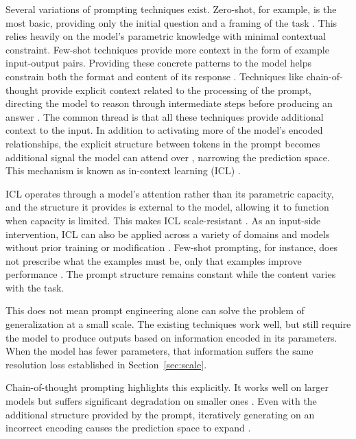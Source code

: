 \documentclass[master]{thesis}
\newcommand{\sref}[1]{Section~\ref{#1}}  %
\begin{document}
Several variations of prompting techniques exist. Zero-shot, for example, is the most basic, providing only the initial question and a framing of the task \cite{brown2020gpt3}. This relies heavily on the model's parametric knowledge with minimal contextual constraint. Few-shot techniques provide more context in the form of example input-output pairs. Providing these concrete patterns to the model helps constrain both the format and content of its response \cite{brown2020gpt3, sahoo2024promptsurvey}. Techniques like chain-of-thought provide explicit context related to the processing of the prompt, directing the model to reason through intermediate steps before producing an answer \cite{wei2022cot}. The common thread is that all these techniques provide additional context to the input. In addition to activating more of the model's encoded relationships, the explicit structure between tokens in the prompt becomes additional signal the model can attend over \cite{olsson2022inductionheads}, narrowing the prediction space. This mechanism is known as in-context learning (ICL) \cite{brown2020gpt3}.

ICL operates through a model's attention rather than its parametric capacity, and the structure it provides is external to the model, allowing it to function when capacity is limited. This makes ICL scale-resistant \cite{costofdownscaling2023}. As an input-side intervention, ICL can also be applied across a variety of domains and models without prior training or modification \cite{brown2020gpt3}. Few-shot prompting, for instance, does not prescribe what the examples must be, only that examples improve performance \cite{sahoo2024promptsurvey}. The prompt structure remains constant while the content varies with the task.

This does not mean prompt engineering alone can solve the problem of generalization at a small scale. The existing techniques work well, but still require the model to produce outputs based on information encoded in its parameters. When the model has fewer parameters, that information suffers the same resolution loss established in \sref{sec:scale}.

Chain-of-thought prompting highlights this explicitly. It works well on larger models \cite{wei2022cot} but suffers significant degradation on smaller ones \cite{cot_degradation_slm2025, smallmodel_learnability2025}. Even with the additional structure provided by the prompt, iteratively generating on an incorrect encoding causes the prediction space to expand \cite{exposure_bias_ilp2022, lpsr2026}.
\end{document}
